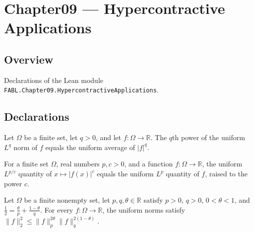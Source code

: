 \chapter{Chapter09 — Hypercontractive Applications}
\section{Overview}

Declarations of the Lean module \texttt{FABL.Chapter09.HypercontractiveApplications}.

\section{Declarations}

\begin{theorem}
\label{FABL.uniformLpNorm_rpow}
\leanok
{}
Let $\Omega$ be a finite set, let $q>0$, and let $f\colon\Omega\to\mathbb R$. The $q$th
power of the uniform $L^q$ norm of $f$ equals the uniform average of $|f|^q$.
\end{theorem}

\begin{theorem}
\label{FABL.uniformLpNorm_abs_rpow}
\leanok
{}
For a finite set $\Omega$, real numbers $p,c>0$, and a function $f:\Omega\to\mathbb{R}$,
the uniform $L^{p/c}$ quantity of $x\mapsto |f(x)|^c$ equals the uniform $L^p$ quantity
of $f$, raised to the power $c$.
\end{theorem}

\begin{theorem}
\label{FABL.uniformLpNorm_two_interpolation_sq}
\leanok
{}
Let $\Omega$ be a finite nonempty set, let $p,q,\theta\in\mathbb R$ satisfy $p>0$,
$q>0$, $0<\theta<1$, and $\frac12=\frac{\theta}{p}+\frac{1-\theta}{q}$. For every
$f:\Omega\to\mathbb R$, the uniform norms satisfy $\|f\|_2^2\le
\|f\|_p^{2\theta}\|f\|_q^{2(1-\theta)}$.
\end{theorem}

